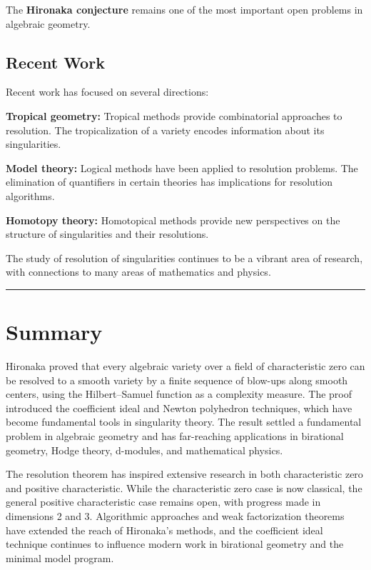 The \textbf{Hironaka conjecture} remains one of the most important open problems in algebraic geometry.

\subsection*{Recent Work}

Recent work has focused on several directions:

\textbf{Tropical geometry:} Tropical methods provide combinatorial approaches to resolution. The tropicalization of a variety encodes information about its singularities.

\textbf{Model theory:} Logical methods have been applied to resolution problems. The elimination of quantifiers in certain theories has implications for resolution algorithms.

\textbf{Homotopy theory:} Homotopical methods provide new perspectives on the structure of singularities and their resolutions.

The study of resolution of singularities continues to be a vibrant area of research, with connections to many areas of mathematics and physics.

\begin{center}\rule{0.5\linewidth}{0.5pt}\end{center}

\section*{Summary}

Hironaka proved that every algebraic variety over a field of characteristic zero can be resolved to a smooth variety by a finite sequence of blow-ups along smooth centers, using the Hilbert--Samuel function as a complexity measure. The proof introduced the coefficient ideal and Newton polyhedron techniques, which have become fundamental tools in singularity theory. The result settled a fundamental problem in algebraic geometry and has far-reaching applications in birational geometry, Hodge theory, d-modules, and mathematical physics.

The resolution theorem has inspired extensive research in both characteristic zero and positive characteristic. While the characteristic zero case is now classical, the general positive characteristic case remains open, with progress made in dimensions 2 and 3. Algorithmic approaches and weak factorization theorems have extended the reach of Hironaka's methods, and the coefficient ideal technique continues to influence modern work in birational geometry and the minimal model program.

